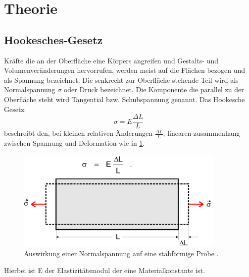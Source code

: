 \section{Theorie}
\label{sec:Theorie}
\subsection{Hookesches-Gesetz}
Kräfte die an der Oberfläche eine Körpers angreifen und Gestalts- und Volumenveränderungen
hervorrufen, werden meist auf die Flächen bezogen und als Spannung bezeichnet.
Die senkrecht zur Oberfläche stehende Teil wird als Normalspannung $\sigma$ oder
Druck bezeichnet. Die Komponente die parallel zu der Oberfläche steht wird Tangential
bzw. Schubspannung genannt. Das Hookesche Gesetz:
\begin{equation}
  \sigma=E\frac{\Delta L}{L}
\end{equation}
beschreibt den, bei kleinen relativen Änderungen $\frac{\Delta L}{L}$, linearen
zusammenhang zwischen Spannung und Deformation wie in \ref{fig:Spannung}.
\begin{figure}
  \centering
  \includegraphics[width=0.9\textwidth]{spannung.png}
  \caption{Auswirkung einer Normalspannung auf eine stabförmige Probe \cite{sample} .}
  \label{fig:Spannung}
\end{figure}
Hierbei ist E der Elastizitätsmodul der eine Materialkonstante ist.
